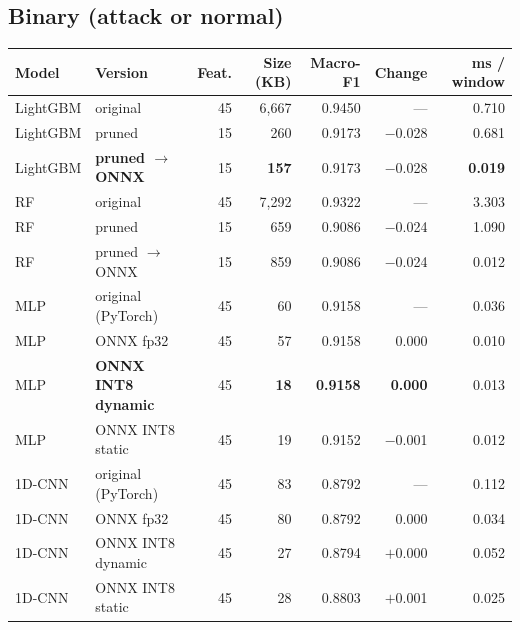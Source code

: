 \documentclass[11pt]{article}
\begin{document}
\subsection*{Binary (attack or normal)}
\begin{longtable}{@{}l l r r r r r@{}}
\toprule
\textbf{Model} & \textbf{Version} & \textbf{Feat.} & \textbf{Size (KB)} & \textbf{Macro-F1} & \textbf{Change} & \textbf{ms / window} \\
\midrule
\endhead
LightGBM & original & 45 & 6,667 & 0.9450 & --- & 0.710 \\
LightGBM & pruned & 15 & 260 & 0.9173 & $-$0.028 & 0.681 \\
LightGBM & \textbf{pruned $\rightarrow$ ONNX} & 15 & \textbf{157} & 0.9173 & $-$0.028 & \textbf{0.019} \\
\midrule
RF & original & 45 & 7,292 & 0.9322 & --- & 3.303 \\
RF & pruned & 15 & 659 & 0.9086 & $-$0.024 & 1.090 \\
RF & pruned $\rightarrow$ ONNX & 15 & 859 & 0.9086 & $-$0.024 & 0.012 \\
\midrule
MLP & original (PyTorch) & 45 & 60 & 0.9158 & --- & 0.036 \\
MLP & ONNX fp32 & 45 & 57 & 0.9158 & 0.000 & 0.010 \\
MLP & \textbf{ONNX INT8 dynamic} & 45 & \textbf{18} & \textbf{0.9158} & \textbf{0.000} & 0.013 \\
MLP & ONNX INT8 static & 45 & 19 & 0.9152 & $-$0.001 & 0.012 \\
\midrule
1D-CNN & original (PyTorch) & 45 & 83 & 0.8792 & --- & 0.112 \\
1D-CNN & ONNX fp32 & 45 & 80 & 0.8792 & 0.000 & 0.034 \\
1D-CNN & ONNX INT8 dynamic & 45 & 27 & 0.8794 & $+$0.000 & 0.052 \\
1D-CNN & ONNX INT8 static & 45 & 28 & 0.8803 & $+$0.001 & 0.025 \\
\bottomrule
\end{longtable}
\end{document}
